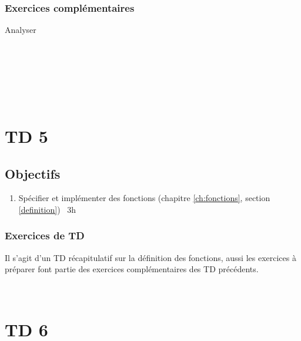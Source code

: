 \subsubsection*{Exercices complémentaires}
\begin{description}
\item[\sc Analyser]\mbox{}\\
	\\
	\\
	\\
	\\

\end{description}

\section*{TD 5}\label{td5}
\subsection*{Objectifs}
\begin{enumerate}
\item Spécifier et implémenter des fonctions
	(chapitre \ref{ch:fonctions}, section \ref{definition})
	\dotfill\ {\color{blue}3h}\mbox{}
\end{enumerate}

\subsubsection*{Exercices de TD}
{\footnotesize\noindent Il s'agit d'un TD récapitulatif sur la définition des fonctions, aussi les exercices à
préparer font partie des exercices complémentaires des TD précédents.}
\vspace*{3mm}

\noindent 
{}\\

\section*{TD 6}\label{td6}
